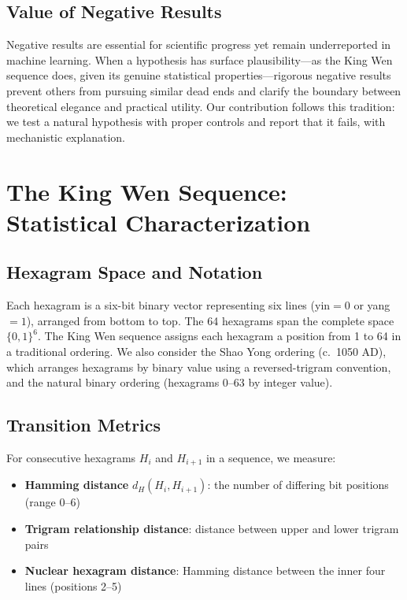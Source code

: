 \documentclass{article}
\begin{document}
\subsection{Value of Negative Results}

Negative results are essential for scientific progress yet remain underreported in machine learning. When a hypothesis has surface plausibility---as the King Wen sequence does, given its genuine statistical properties---rigorous negative results prevent others from pursuing similar dead ends and clarify the boundary between theoretical elegance and practical utility. Our contribution follows this tradition: we test a natural hypothesis with proper controls and report that it fails, with mechanistic explanation.

\section{The King Wen Sequence: Statistical Characterization}\label{sec:stats}

\subsection{Hexagram Space and Notation}

Each hexagram is a six-bit binary vector representing six lines (yin${}=0$ or yang${}=1$), arranged from bottom to top. The 64 hexagrams span the complete space $\{0,1\}^6$. The King Wen sequence assigns each hexagram a position from 1 to 64 in a traditional ordering. We also consider the Shao Yong ordering (c.\ 1050 AD), which arranges hexagrams by binary value using a reversed-trigram convention, and the natural binary ordering (hexagrams 0--63 by integer value).

\subsection{Transition Metrics}

For consecutive hexagrams $H_i$ and $H_{i+1}$ in a sequence, we measure:

\begin{itemize}
\tightlist
\item \textbf{Hamming distance} $d_H(H_i, H_{i+1})$: the number of differing bit positions (range 0--6)
\item \textbf{Trigram relationship distance}: distance between upper and lower trigram pairs
\item \textbf{Nuclear hexagram distance}: Hamming distance between the inner four lines (positions 2--5)
\end{itemize}
\end{document}
